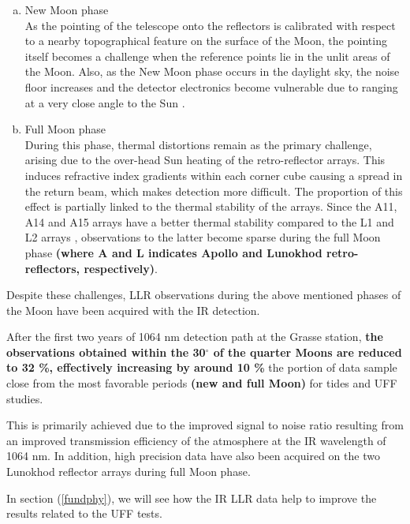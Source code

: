 \documentclass[fleqn,usenatbib,referee]{mnras}
\begin{document}
      \begin{enumerate}[a.]
      \item New Moon phase\\As the pointing of the telescope onto the reflectors is calibrated with respect to a nearby topographical feature on the surface of the Moon, the pointing itself becomes a challenge when the reference points lie in the unlit areas of the Moon. Also, as the New Moon phase occurs in the daylight sky, the noise floor increases and the detector electronics become vulnerable due to ranging at a very close angle to the Sun \textbf{\cite[]{Williams2009,Courde2017}}.

      \item Full Moon phase\\During this phase, thermal distortions remain as the primary challenge, arising due to the over-head Sun heating of the retro-reflector arrays. This induces refractive index gradients within each corner cube causing a spread in the return beam, which makes detection more difficult. The proportion of this effect is partially linked to the thermal stability of the arrays. Since the A11, A14 and A15 arrays have a better thermal stability compared to the L1 and L2 arrays \cite[]{Murphy2014}, observations to the latter become sparse during the full Moon phase \textbf{(where A and L indicates Apollo and Lunokhod retro-reflectors, respectively)}.
    \end{enumerate}
     Despite these challenges, LLR observations during the above mentioned phases of the Moon have been acquired with the IR detection. 

     After the first two years of 1064 nm detection path at the Grasse station, \textbf{the observations obtained within the 30$^{\circ}$ of the quarter Moons are reduced to 32 \%, effectively increasing by around 10 \%} the portion of data sample close from the most favorable periods \textbf{(new and full Moon)} for tides and UFF studies.
      
      This is primarily achieved due to the improved signal to noise ratio resulting from an improved transmission efficiency of the atmosphere at the IR wavelength of 1064 nm. In addition, high precision data have also been acquired on the two Lunokhod reflector arrays during full Moon phase.

      In section (\ref{fundphy}), we will see how the IR LLR data help to improve the results related to the UFF tests.
\end{document}
